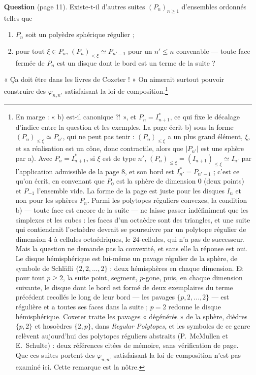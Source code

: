\documentclass[11pt,a4paper]{article}
\begin{document}
\textbf{Question} (page 11). Existe-t-il d'autres suites $(P_{n})_{n \geq 1}$
d'ensembles ordonnés telles que
\begin{enumerate}
\item[a)] $P_{n}$ soit un polyèdre sphérique régulier ;
\item[b)] pour tout $\xi \in P_{n}$, $(P_{n})_{< \xi} \simeq P_{n'-1}$ pour un
$n' \leq n$ convenable --- toute face fermée de $P_{n}$ est un disque dont le
bord est un terme de la suite ?
\end{enumerate}
« Ça doit être dans les livres de Coxeter ! » On aimerait surtout pouvoir
construire des $\varphi_{n,n'}$ satisfaisant la loi de
composition.\footnote{En marge : « b) est-il canonique ?! », et
$P_{n} = I_{n+1}^{*}$, ce qui fixe le décalage d'indice entre la question et les
exemples. La page écrit b) sous la forme $(P_{n})_{\leq \xi} \simeq P_{n'}$,
qui ne peut pas tenir : $(P_{n})_{\leq \xi}$ a un plus grand élément, $\xi$,
et sa réalisation est un cône, donc contractile, alors que $|P_{n'}|$ est une
sphère par a). Avec $P_{n} = I_{n+1}^{*}$, si $\xi$ est de type $n'$,
$(P_{n})_{\leq \xi} = (I_{n+1})_{\leq \xi} \simeq I_{n'}$ par
l'application admissible de la page 8, et son bord est $I_{n'}^{*} =
P_{n'-1}$ ; c'est ce qu'on écrit, en convenant que $P_{0}$ est la sphère de
dimension $0$ (deux points) et $P_{-1}$ l'ensemble vide. La forme de la page
est juste pour les disques $I_{n}$ et non pour les sphères $P_{n}$.
Parmi les polytopes réguliers convexes, la condition b) --- toute face
est encore de la suite --- ne laisse passer indéfiniment que les simplexes et
les cubes : les faces d'un octaèdre sont des triangles, et une suite qui
contiendrait l'octaèdre devrait se poursuivre par un polytope régulier de
dimension 4 à cellules octaédriques, le 24-cellules, qui n'a pas de successeur.
Mais la question ne demande pas la convexité, et sans elle la réponse est oui.
Le disque hémisphérique est lui-même un pavage régulier de la sphère, de
symbole de Schläfli $\{2, 2, \ldots, 2\}$ : deux hémisphères en chaque
dimension. Et pour tout $p \geq 2$, la suite point, segment, $p$-gone, puis,
en chaque dimension suivante, le disque dont le bord est formé de deux
exemplaires du terme précédent recollés le long de leur bord --- les pavages
$\{p, 2, \ldots, 2\}$ --- est régulière et a toutes ses faces dans la
suite ; $p = 2$ redonne le disque hémisphérique. Coxeter
traite les pavages « dégénérés » de la sphère, dièdres $\{p, 2\}$ et
hosoèdres $\{2, p\}$, dans \emph{Regular Polytopes}, et les symboles de ce
genre relèvent aujourd'hui des polytopes réguliers abstraits (P.~McMullen et
E.~Schulte) : deux références citées de mémoire, sans vérification de page.
Que ces suites portent des $\varphi_{n,n'}$ satisfaisant la loi de composition
n'est pas examiné ici. Cette remarque est la nôtre.}
\end{document}
